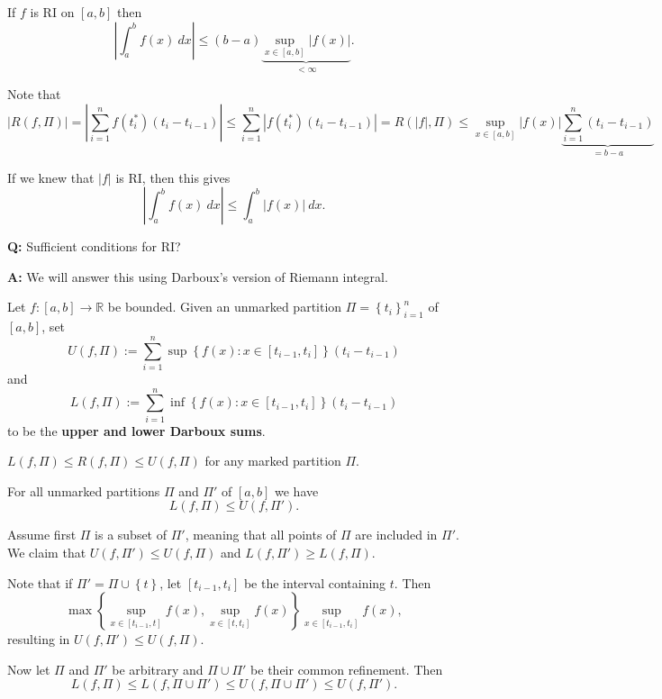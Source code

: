 \documentclass{notes}
\begin{document}
\begin{lem}
  If $f$ is RI on $[a, b]$ then 
  \[
    \left | \int_a^b f(x)\ dx \right | \leq (b - a) \underbrace{\sup_{x \in [a, b]} \left | f(x) \right |}_{{} < \infty}.
  \]
\end{lem}

\begin{prf}
  Note that 
  \[
    \left | R(f, \Pi) \right | = \left | \sum_{i = 1}^n f(t^*_i) (t_i - t_{i - 1}) \right | \leq \sum_{i = 1}^n \left | f(t^*_i) (t_i - t_{i - 1}) \right | = R(\left | f \right |, \Pi) \leq \sup_{x \in [a, b]} \left | f(x) \right | \underbrace{\sum_{i = 1}^n (t_i - t_{i - 1})}_{{} = b - a}
  \]
\end{prf}

\begin{note}
  If we knew that $\left | f \right |$ is RI, then this gives 
  \[
    \left | \int_a^b f(x)\ dx \right | \leq \int_a^b \left | f(x) \right |\ dx.
  \]
\end{note}

{\boldmath \bfseries Q:} Sufficient conditions for RI?

{\boldmath \bfseries A:} We will answer this using Darboux's version of Riemann integral.

\begin{defn}
  Let $f \colon [a, b] \to \mathbb R$ be bounded.
  Given an unmarked partition $\Pi = \left \{ t_i \right \}_{i = 1}^n$ of $[a, b]$, set 
  \[
    U(f, \Pi) := \sum_{i = 1}^n \sup \left \{ f(x) : x \in [t_{i - 1}, t_i] \right \} (t_i - t_{i - 1})
  \]
  and 
  \[
    L(f, \Pi) := \sum_{i = 1}^n \inf \left \{ f(x) : x \in [t_{i - 1}, t_i] \right \} (t_i - t_{i - 1})
  \]
  to be the {\boldmath \bfseries upper and lower Darboux sums}.
\end{defn}

\begin{note}
  $L(f, \Pi) \leq R(f, \Pi) \leq U(f, \Pi)$ for any marked partition $\Pi$.
\end{note}

\begin{lem}
  For all unmarked partitions $\Pi$ and $\Pi'$ of $[a, b]$ we have 
  \[
    L(f, \Pi) \leq U(f, \Pi').
  \]
\end{lem}

\begin{prf}
  Assume first $\Pi$ is a subset of $\Pi'$, meaning that all points of $\Pi$ are included in $\Pi'$.
  We claim that $U(f, \Pi') \leq U(f, \Pi)$ and $L(f, \Pi') \geq L(f, \Pi)$.
  
  Note that if $\Pi' = \Pi \cup \left \{ t \right \}$, let $[t_{i - 1}, t_i]$ be the interval containing $t$.
  Then 
  \[
    \max \left \{ \sup_{x \in [t_{i - 1}, t]} f(x), \sup_{x \in [t, t_i]} f(x) \right \} \sup_{x \in [t_{i - 1}, t_i]} f(x), 
  \]
  resulting in $U(f, \Pi') \leq U(f, \Pi)$.

  Now let $\Pi$ and $\Pi'$ be arbitrary and $\Pi \cup \Pi'$ be their common refinement.
  Then 
  \[
    L(f, \Pi) \leq L(f, \Pi \cup \Pi') \leq U(f, \Pi \cup \Pi') \leq U(f, \Pi').
  \]
\end{prf}
\end{document}
